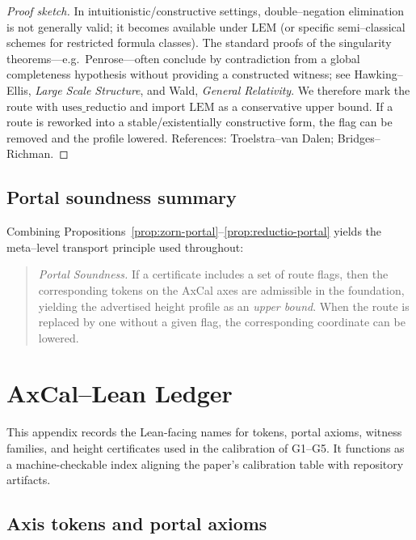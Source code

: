 \documentclass[11pt]{article}
\theoremstyle{definition}
\theoremstyle{remark}
\newcommand{\LEM}{\mathrm{LEM}}
\begin{document}
\begin{proof}[Proof sketch]
In intuitionistic/constructive settings, double–negation elimination is not generally valid; it becomes available under $\LEM$ (or specific semi–classical schemes for restricted formula classes). The standard proofs of the singularity theorems—e.g.\ Penrose—often conclude by contradiction from a global completeness hypothesis without providing a constructed witness; see Hawking–Ellis, \emph{Large Scale Structure}, and Wald, \emph{General Relativity}. We therefore mark the route with $\mathrm{uses\_reductio}$ and import $\LEM$ as a conservative upper bound. If a route is reworked into a stable/existentially constructive form, the flag can be removed and the profile lowered. References: Troelstra–van Dalen; Bridges–Richman. \qedhere
\end{proof}

\subsection{Portal soundness summary}

Combining Propositions~\ref{prop:zorn-portal}–\ref{prop:reductio-portal} yields the meta–level transport principle used throughout:
\begin{quote}
\emph{Portal Soundness.} If a certificate includes a set of route flags, then the corresponding tokens on the AxCal axes are admissible in the foundation, yielding the advertised height profile as an \emph{upper bound}. When the route is replaced by one without a given flag, the corresponding coordinate can be lowered.
\end{quote}

\section{AxCal--Lean Ledger}\label{app:ledger}

This appendix records the Lean-facing names for tokens, portal axioms, witness families, and height certificates used in the calibration of G1--G5. It functions as a machine-checkable index aligning the paper's calibration table with repository artifacts.

\subsection{Axis tokens and portal axioms}\label{app:tokens-portals}
\end{document}
